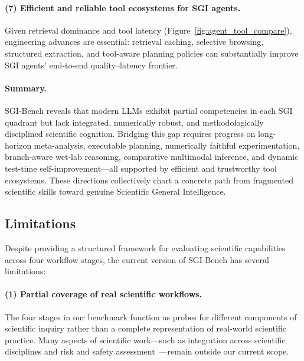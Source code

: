 \paragraph{(7) Efficient and reliable tool ecosystems for SGI agents.}
Given retrieval dominance and tool latency (Figure~\ref{fig:agent_tool_compare}), engineering advances are essential: retrieval caching, selective browsing, structured extraction, and tool-aware planning policies can substantially improve SGI agents' end-to-end quality--latency frontier. 

\paragraph{Summary.}
SGI-Bench reveals that modern LLMs exhibit partial competencies in each SGI quadrant but lack integrated, numerically robust, and methodologically disciplined scientific cognition. Bridging this gap requires progress on long-horizon meta-analysis, executable planning, numerically faithful experimentation, branch-aware wet-lab reasoning, comparative multimodal inference, and dynamic test-time self-improvement---all supported by efficient and trustworthy tool ecosystems. These directions collectively chart a concrete path from fragmented scientific skills toward genuine Scientific General Intelligence.


\subsection{Limitations}

Despite providing a structured framework for evaluating scientific capabilities across four workflow stages, the current version of SGI-Bench has several limitations:

\paragraph{(1) Partial coverage of real scientific workflows.}
The four stages in our benchmark function as probes for different components of scientific inquiry rather than a complete representation of real-world scientific practice. Many aspects of scientific work—such as integration across scientific disciplines and risk and safety assessment~\cite{Zhou2024LabSafetyBB}—remain outside our current scope.

